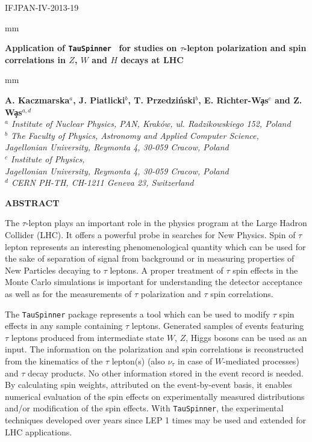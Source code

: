 \documentclass{article}
\begin{document}
\begin{titlepage}
 
\begin{flushright} 
{ IFJPAN-IV-2013-19 %
} 
\end{flushright}
 
 mm
\begin{center}
{\bf\huge  Application of {\tt TauSpinner } for studies on $\tau$-lepton polarization 
and spin correlations in $Z$, $W$ and $H$ decays at LHC}
\end{center}
 mm

\begin{center}
   {\bf A. Kaczmarska$^{a}$,   J. Piatlicki$^{b}$,
        T. Przedzi\'nski$^{b}$, E. Richter-W\c{a}s$^{c}$
 and Z. W\c{a}s$^{a,d}$  }\\
       {\em $^a$  Institute of Nuclear Physics, PAN,
        Krak\'ow, ul. Radzikowskiego 152, Poland}\\ 
       {\em $^b$ The Faculty of Physics, Astronomy and Applied Computer Science, \\ 
Jagellonian University, Reymonta 4, 30-059 Cracow, Poland}\\
       {\em $^c$ Institute of Physics, \\ 
Jagellonian University, Reymonta 4, 30-059 Cracow, Poland}\\
{\em $^d$ CERN PH-TH, CH-1211 Geneva 23, Switzerland }
\end{center}
\vspace{1.1 cm}
\begin{center}
{\bf   ABSTRACT  }
\end{center}

The $\tau$-lepton plays an important role in the physics program at the Large Hadron Collider 
(LHC). It offers a powerful probe in searches for New Physics.
Spin of $\tau$ lepton represents an interesting phenomenological quantity which can be used
for the sake of separation of signal from background or in measuring  properties
of New Particles decaying to $\tau$ leptons. 
A proper treatment of $\tau$ spin effects in the Monte Carlo simulations is important for
understanding  the detector acceptance as well as for the measurements of $\tau$
polarization and $\tau$ spin correlations.

The {\tt TauSpinner} package represents a tool which can be used to modify $\tau$ spin effects in any
sample containing $\tau$ leptons. 
Generated samples of events featuring $\tau$ leptons produced from intermediate state 
$W$, $Z$, Higgs bosons can be used as an input.
The information on the polarization and spin correlations is reconstructed from the kinematics of the 
$\tau$ lepton(s) (also $\nu_\tau$ in case of $W$-mediated processes) and $\tau$ decay products.  No other information stored in the event record is needed.
By calculating spin weights, attributed on the event-by-event basis, it enables numerical evaluation of 
the spin effects on experimentally measured distributions and/or modification of the spin effects.
With {\tt TauSpinner}, the experimental techniques developed over years since LEP 1 times may be 
used and extended for LHC applications.


\end{titlepage}
\end{document}
